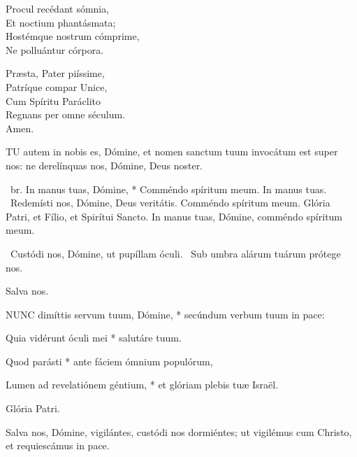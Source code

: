 Procul recédant sómnia,\\
Et noctium phantásmata;\\
Hostémque nostrum cómprime,\\
Ne polluántur córpora.

Præsta, Pater piíssime,\\
Patríque compar Unice,\\
Cum Spíritu Paráclito\\
Regnans per omne séculum.\\
Amen.



\lettrine[lines=2]{T}{U} autem in nobis es, Dómine, et nomen sanctum tuum invocátum est super nos: ne derelínquas nos, Dómine, Deus noster.

\R\ br. In manus tuas, Dómine, * Comméndo spíritum meum. In manus tuas. \V\ Redemísti nos, Dómine, Deus veritátis. Comméndo spíritum meum. Glória Patri, et Fílio, et Spirítui Sancto. In manus tuas, Dómine, comméndo spíritum meum.

\V\ Custódi nos, Dómine, ut pupíllam óculi. \R\ Sub umbra alárum tuárum prótege nos.


 Salva nos.


\lettrine[lines=2]{N}{UNC} dimíttis servum tuum, Dómine, * secúndum verbum tuum in pace:

Quia vidérunt óculi mei * salutáre tuum.

Quod parásti * ante fáciem ómnium populórum,

Lumen ad revelatiónem géntium, * et glóriam plebis tuæ Israël.

Glória Patri.

 Salva nos, Dómine, vigilántes, custódi nos dormiéntes; ut vigilémus cum Christo, et requiescámus in pace.



